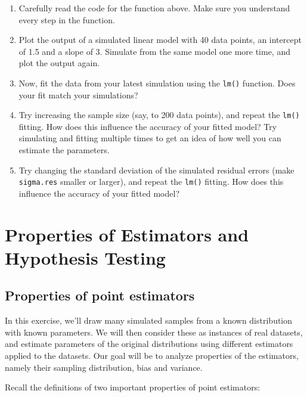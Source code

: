 \documentclass[
]{book}
\providecommand{\tightlist}{%
  \setlength{\itemsep}{0pt}\setlength{\parskip}{0pt}}
\begin{document}
\begin{enumerate}
\def\labelenumi{\alph{enumi})}
\tightlist
\item
  Carefully read the code for the function above. Make sure you understand every step in the function.\\
\item
  Plot the output of a simulated linear model with 40 data points, an intercept of 1.5 and a slope of 3. Simulate from the same model one more time, and plot the output again.\\
\item
  Now, fit the data from your latest simulation using the \texttt{lm()} function. Does your fit match your simulations?\\
\item
  Try increasing the sample size (say, to 200 data points), and repeat the \texttt{lm()} fitting. How does this influence the accuracy of your fitted model? Try simulating and fitting multiple times to get an idea of how well you can estimate the parameters.\\
\item
  Try changing the standard deviation of the simulated residual errors (make \texttt{sigma.res} smaller or larger), and repeat the \texttt{lm()} fitting. How does this influence the accuracy of your fitted model?
\end{enumerate}

\hypertarget{properties-of-estimators-and-hypothesis-testing}{%
\chapter{Properties of Estimators and Hypothesis Testing}\label{properties-of-estimators-and-hypothesis-testing}}

\hypertarget{properties-of-point-estimators}{%
\section{Properties of point estimators}\label{properties-of-point-estimators}}

In this exercise, we'll draw many simulated samples from a known distribution with known parameters. We will then consider these as instances of real datasets, and estimate parameters of the original distributions using different estimators applied to the datasets. Our goal will be to analyze properties of the estimators, namely their sampling distribution, bias and variance.

Recall the definitions of two important properties of point estimators:
\end{document}

